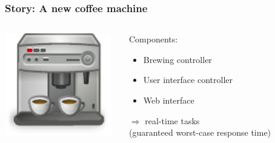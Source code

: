 \documentclass[aspectratio=1610,xcolor=svgnames]{beamer}
\begin{document}
\begin{frame}\frametitle{Story: A new coffee machine}
  \vspace{1cm}
  \begin{columns}
    \begin{column}{0.5\textwidth}
      \includegraphics[width=0.95\textwidth]{coffee.pdf}
    \end{column}
    \begin{column}{0.5\textwidth}
      {\Large Components:}
      \begin{itemize}
      \item Brewing controller
      \item User interface controller
      \item Web interface
      \end{itemize}
      \vspace{0.5cm}
      \pause
      {\Large $\Rightarrow$ real-time tasks} \\
      (guaranteed worst-case response time)
    \end{column}
  \end{columns}
\end{frame}
\end{document}
